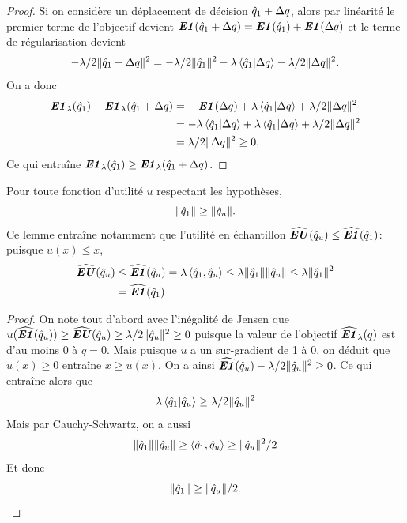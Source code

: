 \begin{proof}
  Si on considère un déplacement de décision $\hat q_1 + \Delta q$, alors par linéarité le premier
  terme de l'objectif devient $\operatorname{\mbox{\textbf{\textit{E1}}}}(\hat q_1+\Delta q) = \operatorname{\mbox{\textbf{\textit{E1}}}}(\hat q_1) + \operatorname{\mbox{\textbf{\textit{E1}}}}(\Delta q)$ et le terme de
  régularisation devient 
  \begin{equation}
    -\lambda/2\|\hat q_1 + \Delta q\|^2 = -\lambda/2\|\hat q_1\|^2 - \lambda\braket{\hat q_1|\Delta q} - \lambda/2\|\Delta q\|^2.
  \end{equation}
  On a donc
  \begin{align}
    \operatorname{\mbox{\textbf{\textit{E1}}}}_\lambda(\hat q_1)  - \operatorname{\mbox{\textbf{\textit{E1}}}}_\lambda(\hat q_1+\Delta q) &= -\operatorname{\mbox{\textbf{\textit{E1}}}}(\Delta q) + \lambda\braket{\hat q_1|\Delta q} + \lambda/2\|\Delta q\|^2\\
                                     &= -\lambda\braket{\hat q_1|\Delta q} + \lambda\braket{\hat q_1|\Delta q} +
                                       \lambda/2\|\Delta q\|^2\\
                                     &= \lambda/2\|\Delta q\|^2 \geq 0,
  \end{align}
  Ce qui entraîne $\operatorname{\mbox{\textbf{\textit{E1}}}}_\lambda(\hat q_1) \geq \operatorname{\mbox{\textbf{\textit{E1}}}}_\lambda(\hat q_1 + \Delta q)$.
\end{proof}

\begin{lemme}
  \label{lem:rn}
  Pour toute fonction d'utilité $u$ respectant les hypothèses,
  \begin{equation}
    \|\hat q_1\| \geq \|\hat q_u\|.
  \end{equation}
  Ce lemme entraîne notamment que l'utilité en échantillon $\operatorname{\widehat{\operatorname{\mbox{\textbf{\textit{EU}}}}}}(\hat q_u) \leq \operatorname{\widehat{\operatorname{\mbox{\textbf{\textit{E1}}}}}}(\hat q_1)$:
  puisque $u(x) \leq x$,
  \begin{align}
    \operatorname{\widehat{\operatorname{\mbox{\textbf{\textit{EU}}}}}}(\hat q_u)&\leq \operatorname{\widehat{\operatorname{\mbox{\textbf{\textit{E1}}}}}}(\hat q_u) = \lambda\braket{\hat q_1,\hat q_u} \leq \lambda\|\hat q_1\|\|\hat q_u\| \leq \lambda\|\hat q_1\|^2\\
               &=  \operatorname{\widehat{\operatorname{\mbox{\textbf{\textit{E1}}}}}}(\hat q_1)
  \end{align}
\end{lemme}

\begin{proof}
  On note tout d'abord avec l'inégalité de Jensen que
  $u(\operatorname{\widehat{\operatorname{\mbox{\textbf{\textit{E1}}}}}}(\hat q_u)) \geq \operatorname{\widehat{\operatorname{\mbox{\textbf{\textit{EU}}}}}}(\hat q_u) \geq \lambda/2\|\hat q_u\|^2 \geq 0$ puisque la valeur de l'objectif
  $\operatorname{\widehat{\operatorname{\mbox{\textbf{\textit{E1}}}}}}_\lambda(q)$ est d'au moins 0 à $q=0$. Mais puisque $u$ a un sur-gradient de 1 à
  $0$, on déduit que $u(x) \geq 0$ entraîne $x \geq u(x)$. On a ainsi
  $\operatorname{\widehat{\operatorname{\mbox{\textbf{\textit{E1}}}}}}(\hat q_u) - \lambda/2\|\hat q_u\|^2 \geq 0$. Ce qui entraîne alors que
  \begin{equation}
    \lambda\braket{\hat q_1|\hat q_u} \geq \lambda/2\|\hat q_u\|^2
  \end{equation}
  Mais par Cauchy-Schwartz, on a aussi
  \begin{equation}
    \|\hat q_1\|\|\hat q_u\| \geq \braket{\hat q_1,\hat q_u} \geq \|\hat q_u\|^2/2
  \end{equation}
  Et donc
  \begin{equation}
    \|\hat q_1\| \geq \|\hat q_u\|/2.\qedhere
  \end{equation}
\end{proof}


